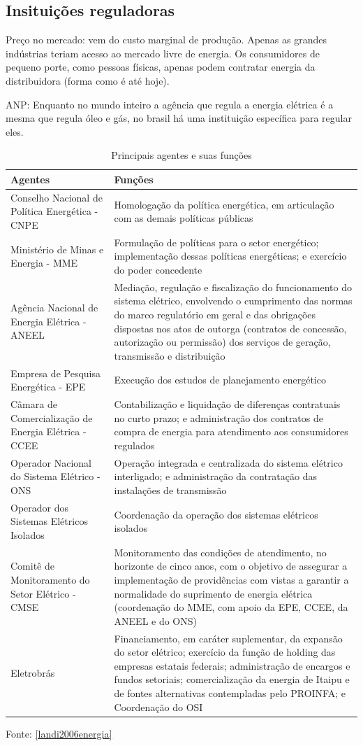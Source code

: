\subsection{Insituições reguladoras}

Preço no mercado: vem do custo marginal de produção. Apenas as grandes
indústrias teriam acesso ao mercado livre de energia. Os consumidores
de pequeno porte, como pessoas físicas, apenas podem contratar energia
da distribuidora (forma como é até hoje).

ANP: Enquanto no mundo inteiro a agência que regula a energia elétrica
é a mesma que regula óleo e gás, no brasil há uma instituição específica
para regular eles.

\begin{table}
\begin{tabular}{>{\raggedright}p{}|>{\raggedright}p{}}
\hline 
Agentes & Funções\tabularnewline
\hline 
\hline 
Conselho Nacional de Política Energética - CNPE & Homologação da política energética, em articulação com as demais políticas
públicas\tabularnewline
\hline 
Ministério de Minas e Energia - MME & Formulação de políticas para o setor energético; implementação dessas
políticas energéticas; e exercício do poder concedente\tabularnewline
\hline 
Agência Nacional de Energia Elétrica - ANEEL & Mediação, regulação e fiscalização do funcionamento do sistema elétrico,
envolvendo o cumprimento das normas do marco regulatório em geral
e das obrigações dispostas nos atos de outorga (contratos de concessão,
autorização ou permissão) dos serviços de geração, transmissão e distribuição\tabularnewline
\hline 
Empresa de Pesquisa Energética - EPE & Execução dos estudos de planejamento energético\tabularnewline
\hline 
Câmara de Comercialização de Energia Elétrica - CCEE & Contabilização e liquidação de diferenças contratuais no curto prazo;
e administração dos contratos de compra de energia para atendimento
aos consumidores regulados\tabularnewline
\hline 
Operador Nacional do Sistema Elétrico - ONS & Operação integrada e centralizada do sistema elétrico interligado;
e administração da contratação das instalações de transmissão\tabularnewline
\hline 
Operador dos Sistemas Elétricos Isolados & Coordenação da operação dos sistemas elétricos isolados\tabularnewline
\hline 
Comitê de Monitoramento do Setor Elétrico - CMSE & Monitoramento das condições de atendimento, no horizonte de cinco
anos, com o objetivo de assegurar a implementação de providências
com vistas a garantir a normalidade do suprimento de energia elétrica
(coordenação do MME, com apoio da EPE, CCEE, da ANEEL e do ONS)\tabularnewline
\hline 
Eletrobrás & Financiamento, em caráter suplementar, da expansão do setor elétrico;
exercício da função de holding das empresas estatais federais; administração
de encargos e fundos setoriais; comercialização da energia de Itaipu
e de fontes alternativas contempladas pelo PROINFA; e Coordenação
do OSI\tabularnewline
\hline 
\end{tabular}

Fonte: \ref{landi2006energia}

\protect\caption{Principais agentes e suas funções\label{tab:instituicoes}}
\end{table}


